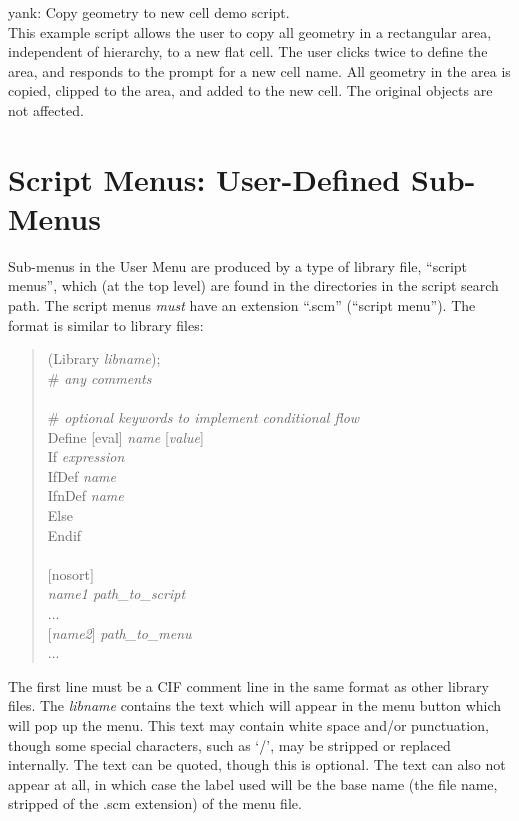 \begin{description}
\item{\cb yank}: Copy geometry to new cell demo script.\\
This example script allows the user to copy all geometry in a
rectangular area, independent of hierarchy, to a new flat cell.  The
user clicks twice to define the area, and responds to the prompt for a
new cell name.  All geometry in the area is copied, clipped to the
area, and added to the new cell.  The original objects are not
affected.
\end{description}


\section{Script Menus: User-Defined Sub-Menus}

Sub-menus in the {\cb User Menu} are produced by a type of library
file, ``script menus'', which (at the top level) are found in the
directories in the script search path.  The script menus {\it must}
have an extension ``{\vt .scm}'' (``script menu'').  The format is
similar to library files:

\begin{quote}
    {\vt (Library {\it libname\/});}\\
    {\vt \#} {\it any comments}\\
    \\
    {\vt \#} {\it optional keywords to implement conditional flow}\\
    {\vt Define} [{\vt eval}] {\it name} [{\it value\/}]\\
    {\vt If} {\it expression}\\
    {\vt IfDef} {\it name}\\
    {\vt IfnDef} {\it name}\\
    {\vt Else}\\
    {\vt Endif}\\
    \\
    $[${\vt nosort}$]$\\
    {\it name1   path\_to\_script}\\
    ...\\
    $[${\it name2\/}$]$   {\it path\_to\_menu}\\
    ...
\end{quote}

The first line must be a CIF comment line in the same format as other
library files.  The {\it libname} contains the text which will appear
in the menu button which will pop up the menu.  This text may contain
white space and/or punctuation, though some special characters, such
as `/', may be stripped or replaced internally.  The text can be
quoted, though this is optional.  The text can also not appear at all,
in which case the label used will be the base name (the file name,
stripped of the {\vt .scm} extension) of the menu file.

